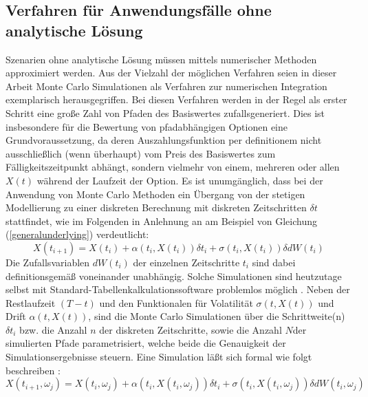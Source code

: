 \documentclass[12pt,a4paper,headsepline,bibliography=totoc,listof=totoc,headinclude=false,footinclude=false,BCOR5mm]{scrreprt} %
\begin{document}
\subsection{Verfahren f\"ur Anwendungsf\"alle ohne analytische L\"osung} 
Szenarien ohne analytische L\"osung m\"ussen mittels numerischer Methoden approximiert werden. Aus der Vielzahl der m\"oglichen Verfahren \cite{Singer1999}\cite{Fries2007} seien in dieser Arbeit Monte Carlo Simulationen als Verfahren zur numerischen Integration exemplarisch herausgegriffen. Bei diesen Verfahren werden in der Regel als erster Schritt eine gro{\ss}e Zahl von Pfaden des Basiswertes zufallsgeneriert. Dies ist insbesondere f\"ur die Bewertung von pfadabh\"angigen Optionen eine Grundvoraussetzung, da deren Auszahlungsfunktion per definitionem nicht ausschlie{\ss}lich (wenn \"uberhaupt) vom Preis des Basiswertes zum F\"alligkeitszeitpunkt abh\"angt, sondern vielmehr von einem, mehreren oder allen $X(t)$ w\"ahrend der Laufzeit der Option.  Es ist unumg\"anglich, dass bei der Anwendung von Monte Carlo Methoden ein \"Ubergang von der stetigen Modellierung zu einer diskreten Berechnung mit diskreten Zeitschritten $\delta t$ stattfindet, wie im Folgenden in Anlehnung an \cite{Brandimarte2006, Fries2007} am Beispiel von Gleichung (\ref{generalunderlying}) verdeutlicht:
  \begin{equation} \label{generalmonte}
X(t_{i+1}) =  X(t_i) +  \alpha(t_i,X(t_i))  \delta t_i  +  \sigma(t_i,X(t_i)) \delta dW(t_i) \end{equation}
Die Zufallsvariablen $dW(t_i)$ der einzelnen Zeitschritte $t_i$ sind dabei definitionsgem\"a{\ss} voneinander unabh\"angig. Solche Simulationen sind heutzutage selbst mit Standard-Tabellen\-kalkulationssoftware problemlos m\"oglich %
\cite{Chance2004} \cite{Harper2008}. Neben der Restlaufzeit $(T-t)$ und den Funktionalen f\"ur Volatilit\"at $\sigma(t,X(t))$ und Drift $\alpha(t,X(t))$, sind die Monte Carlo Simulationen \"uber die Schrittweite(n) $\delta t_i$ bzw. die Anzahl $n$ der diskreten Zeitschritte, sowie die Anzahl $N$der simulierten Pfade parametrisiert, welche beide die Genauigkeit der Simulationsergebnisse steuern. Eine Simulation l\"a{\ss}t sich formal wie folgt beschreiben \cite[S.187]{Fries2007}:
  \begin{equation} \label{generalmontepfad}
X(t_{i+1},\omega_j) =  X(t_i,\omega_j) +  \alpha(t_i,X(t_i,\omega_j))  \delta t_i  +  \sigma(t_i,X(t_i,\omega_j)) \delta dW(t_i,\omega_j) \end{equation}
\end{document}
